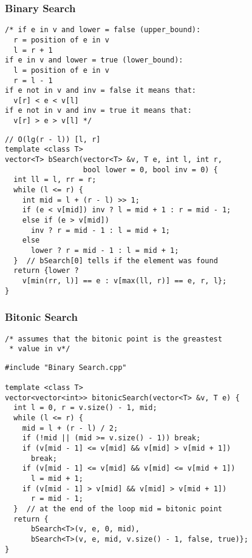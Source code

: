 \documentclass[twoside]{article}
\begin{document}
\begin{multicols*}{2}
\subsubsection*{Binary Search}
\begin{verbatim}
/* if e in v and lower = false (upper_bound):
  r = position of e in v
  l = r + 1
if e in v and lower = true (lower_bound):
  l = position of e in v
  r = l - 1
if e not in v and inv = false it means that:
  v[r] < e < v[l]
if e not in v and inv = true it means that:
  v[r] > e > v[l] */
\end{verbatim}
\vspace{-12pt}
\begin{verbatim}
// O(lg(r - l)) [l, r]
template <class T>
vector<T> bSearch(vector<T> &v, T e, int l, int r,
                  bool lower = 0, bool inv = 0) {
  int ll = l, rr = r;
  while (l <= r) {
    int mid = l + (r - l) >> 1;
    if (e < v[mid]) inv ? l = mid + 1 : r = mid - 1;
    else if (e > v[mid])
      inv ? r = mid - 1 : l = mid + 1;
    else
      lower ? r = mid - 1 : l = mid + 1;
  }  // bSearch[0] tells if the element was found
  return {lower ?
    v[min(rr, l)] == e : v[max(ll, r)] == e, r, l};
}
\end{verbatim}

\subsubsectionfont{\large\bfseries\sffamily\underline}
\subsubsection*{Bitonic Search}
\begin{verbatim}
/* assumes that the bitonic point is the greastest
 * value in v*/

\end{verbatim}
\vspace{-12pt}
\begin{verbatim}
#include "Binary Search.cpp"

template <class T>
vector<vector<int>> bitonicSearch(vector<T> &v, T e) {
  int l = 0, r = v.size() - 1, mid;
  while (l <= r) {
    mid = l + (r - l) / 2;
    if (!mid || (mid >= v.size() - 1)) break;
    if (v[mid - 1] <= v[mid] && v[mid] > v[mid + 1])
      break;
    if (v[mid - 1] <= v[mid] && v[mid] <= v[mid + 1])
      l = mid + 1;
    if (v[mid - 1] > v[mid] && v[mid] > v[mid + 1])
      r = mid - 1;
  }  // at the end of the loop mid = bitonic point
  return {
      bSearch<T>(v, e, 0, mid),
      bSearch<T>(v, e, mid, v.size() - 1, false, true)};
}
\end{verbatim}


\end{multicols*}
\end{document}
